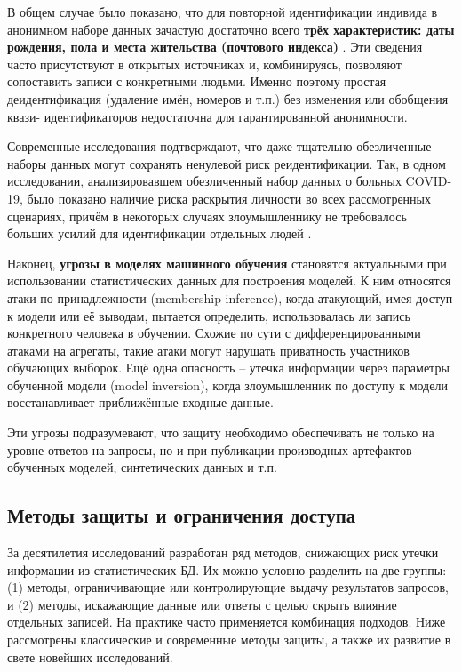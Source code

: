 В общем случае было показано, что для повторной идентификации индивида в анонимном наборе
данных зачастую достаточно всего \textbf{трёх характеристик: даты рождения, пола и места
жительства (почтового индекса)} \autocite{sweeney2002kanon}. Эти сведения часто присутствуют в открытых источниках и,
комбинируясь, позволяют сопоставить записи с конкретными людьми. Именно поэтому простая
деидентификация (удаление имён, номеров и т.п.) без изменения или обобщения квази-
идентификаторов недостаточна для гарантированной анонимности.

Современные исследования подтверждают, что даже тщательно обезличенные наборы данных могут
сохранять ненулевой риск реидентификации. Так, в одном исследовании, анализировавшем
обезличенный набор данных о больных COVID-19, было показано наличие риска раскрытия
личности во всех рассмотренных сценариях, причём в некоторых случаях злоумышленнику не
требовалось больших усилий для идентификации отдельных людей \autocite{journals-plos-org}.

Наконец, \textbf{угрозы в моделях машинного обучения} становятся актуальными при
использовании статистических данных для построения моделей. К ним относятся атаки по
принадлежности (membership inference), когда атакующий, имея доступ к модели или её
выводам, пытается определить, использовалась ли запись конкретного человека в обучении.
Схожие по сути с дифференцированными атаками на агрегаты, такие атаки могут нарушать
приватность участников обучающих выборок. Ещё одна опасность – утечка информации через
параметры обученной модели (model inversion), когда злоумышленник по доступу к модели
восстанавливает приближённые входные данные.

Эти угрозы подразумевают, что защиту необходимо обеспечивать не только на уровне ответов
на запросы, но и при публикации производных артефактов – обученных моделей, синтетических
данных и т.п.

\subsection{Методы защиты и ограничения доступа}
За десятилетия исследований разработан ряд методов, снижающих риск утечки информации из статистических БД. Их можно
условно разделить на две группы: (1) методы, ограничивающие или контролирующие выдачу результатов запросов, и (2)
методы, искажающие данные или ответы с целью скрыть влияние отдельных записей. На практике часто применяется комбинация
подходов. Ниже рассмотрены классические и современные методы защиты, а также их развитие в свете новейших исследований.

